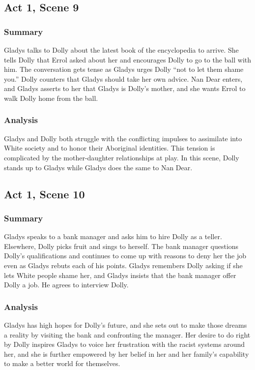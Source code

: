 \documentclass[a4paper]{article}
\begin{document}
\subsection{Act 1, Scene 9}
\subsubsection{Summary}
Gladys talks to Dolly about the latest book of the encyclopedia
to arrive. She tells Dolly that Errol asked about her and
encourages Dolly to go to the ball with him. The conversation
gets tense as Gladys urges Dolly “not to let them shame you.”
Dolly counters that Gladys should take her own advice. Nan
Dear enters, and Gladys asserts to her that Gladys is Dolly’s
mother, and she wants Errol to walk Dolly home from the ball.\\

\subsubsection{Analysis}
Gladys and Dolly both struggle with the conflicting impulses to
assimilate into White society and to honor their Aboriginal
identities. This tension is complicated by the mother-daughter
relationships at play. In this scene, Dolly stands up to Gladys while
Gladys does the same to Nan Dear.\\

\subsection{Act 1, Scene 10}
\subsubsection{Summary}
Gladys speaks to a bank manager and asks him to hire Dolly as
a teller. Elsewhere, Dolly picks fruit and sings to herself. The
bank manager questions Dolly’s qualifications and continues to
come up with reasons to deny her the job even as Gladys
rebuts each of his points. Gladys remembers Dolly asking if she
lets White people shame her, and Gladys insists that the bank
manager offer Dolly a job. He agrees to interview Dolly.\\

\subsubsection{Analysis}
Gladys has high hopes for Dolly’s future, and she sets out to make
those dreams a reality by visiting the bank and confronting the
manager. Her desire to do right by Dolly inspires Gladys to voice her
frustration with the racist systems around her, and she is further
empowered by her belief in her and her family’s capability to make a
better world for themselves.\\
\end{document}
